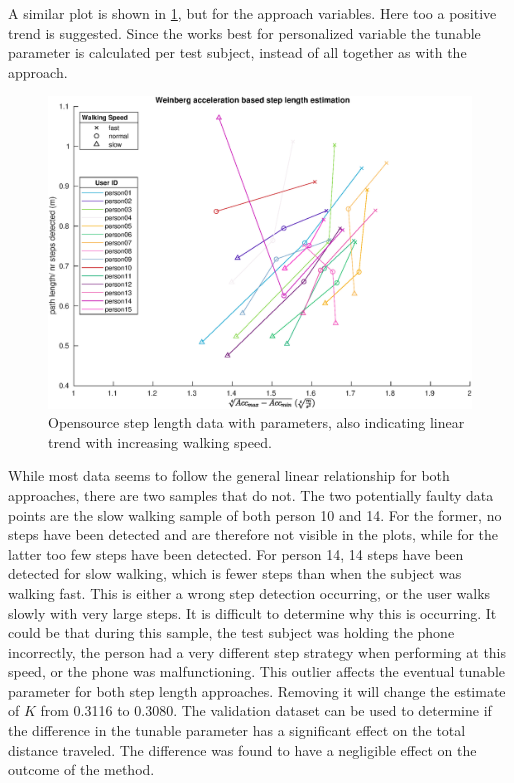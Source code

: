 A similar plot is shown in \cref{fig:step_length_weinberg}, but for the \citet{Weinberg2002} approach variables. Here too a positive trend is suggested. Since the \citet{Weinberg2002} works best for personalized variable the tunable parameter is calculated per test subject, instead of all together as with the \citet{Tian2016} approach. 

\begin{figure}[H]
	\centering
	\includegraphics[width=0.8\linewidth]{images/20201113_1639_weinberg}
	\caption{Opensource step length data with \citet{Weinberg2002} parameters, also indicating linear trend with increasing walking speed.}
	\label{fig:step_length_weinberg}
\end{figure}

While most data seems to follow the general linear relationship for both approaches, there are two samples that do not. The two potentially faulty data points are the slow walking sample of both person 10 and 14. For the former, no steps have been detected and are therefore not visible in the plots, while for the latter too few steps have been detected. For person 14, 14 steps have been detected for slow walking, which is fewer steps than when the subject was walking fast. This is either a wrong step detection occurring, or the user walks slowly with very large steps. It is difficult to determine why this is occurring. It could be that during this sample, the test subject was holding the phone incorrectly, the person had a very different step strategy when performing at this speed, or the phone was malfunctioning. This outlier affects the eventual tunable parameter for both step length approaches. Removing it will change the estimate of $K$ from 0.3116 to 0.3080. The validation dataset can be used to determine if the difference in the tunable parameter has a significant effect on the total distance traveled. The difference was found to have a negligible effect on the outcome of the method.

